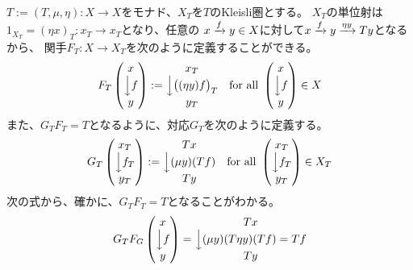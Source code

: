 {	$T:=(T,\mu,\eta):X\to X$をモナド、$X_T$を$T$のKleisli圏とする。
	$X_T$の単位射は$1_{X_T}=(\eta x)_T:x_T\to x_T$となり、任意の
	$x\xrightarrow[{}]{f}y\in X$に対して$x\xrightarrow[{}]{f}y\xrightarrow[{}]{\eta y}Ty$となるから、
	関手$F_T:X\to X_T$を次のように定義することができる。
	\begin{equation*}\begin{split}
		F_T \begin{pmatrix}
			x \\ \Big\downarrow{f} \\ y
		\end{pmatrix} := \begin{matrix}
			x_T \\ \Big\downarrow{\mathinner{\bigl({(\eta y)f}\bigr)}_T} \\ y_T
		\end{matrix} \quad\text{for all } \begin{pmatrix}
			x \\ \Big\downarrow{f} \\ y
		\end{pmatrix}\in X
	\end{split}\end{equation*}
	また、$G_TF_T=T$となるように、対応$G_T$を次のように定義する。
	\begin{equation*}\begin{split}
		G_T \begin{pmatrix}
			x_T \\ \Big\downarrow{f_T} \\ y_T
		\end{pmatrix} := \begin{matrix}
			Tx \\ \Big\downarrow{(\mu y)(Tf)} \\ Ty
		\end{matrix} \quad\text{for all } \begin{pmatrix}
			x_T \\ \Big\downarrow{f_T} \\ y_T
		\end{pmatrix}\in X_T
	\end{split}\end{equation*}
	次の式から、確かに、$G_TF_T=T$となることがわかる。
	\begin{equation*}\begin{split}
		G_TF_G \begin{pmatrix}
			x \\ \Big\downarrow{f} \\ y
		\end{pmatrix} = \begin{matrix}
			Tx \\ \Big\downarrow{(\mu y)(T\eta y)(Tf)=Tf} \\ Ty

\end{matrix}
\end{split}
\end{equation*}}

